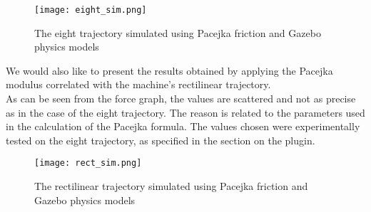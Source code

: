 \begin{figure}[H]
	\texttt{[image: eight\_sim.png]}
	\caption{The eight trajectory simulated using Pacejka friction and Gazebo physics models}
\end{figure}

We would also like to present the results obtained by applying the Pacejka modulus correlated with the machine's rectilinear trajectory. \\
As can be seen from the force graph, the values are scattered and not as precise as in the case of the eight trajectory. The reason is related to the parameters used in the calculation of the Pacejka formula. The values chosen were experimentally tested on the eight trajectory, as specified in the section on the plugin.
\begin{figure}[H]
	\texttt{[image: rect\_sim.png]}
	\caption{The rectilinear trajectory simulated using Pacejka friction and Gazebo physics models}
\end{figure}